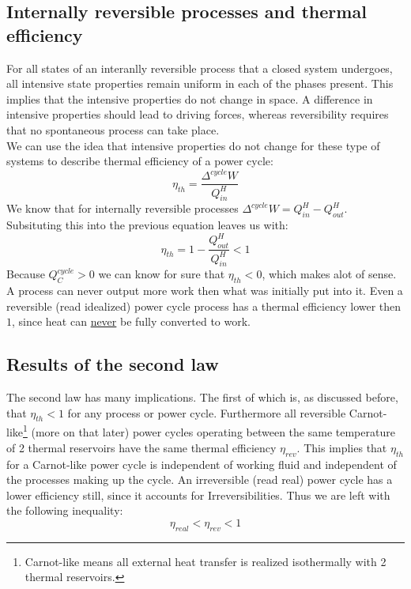 \documentclass[11pt, a4paper]{article}
\begin{document}
\subsection{Internally reversible processes and thermal efficiency}
For all states of an interanlly reversible process that a closed system undergoes, all intensive state properties remain uniform in each of the phases present. This implies that the intensive properties do not change in space. A difference in intensive properties should lead to driving forces, whereas reversibility requires that no spontaneous process can take place.\\
We can use the idea that intensive properties do not change for these type of systems to describe thermal efficiency of a power cycle:
\begin{equation}
  \eta_{th} = \frac{\Delta^{cycle}W}{Q_{in}^H}
\end{equation}
We know that for internally reversible processes $\Delta^{cycle}W = Q_{in}^H - Q_{out}^H$. Subsituting this into the previous equation leaves us with:
\begin{equation}
  \eta_{th} = 1 - \frac{Q_{out}^H}{Q_{in}^H} < 1
\end{equation}
Because $Q_C^{cycle} > 0$ we can know for sure that $\eta_{th} < 0$, which makes alot of sense. A process can never output more work then what was initially put into it. Even a reversible (read idealized) power cycle process has a thermal efficiency lower then $1$, since heat can \underline{never} be fully converted to work.


\subsection{Results of the second law}
The second law has many implications. The first of which is, as discussed before, that $\eta_{th} < 1$ for any process or power cycle. Furthermore all reversible Carnot-like\footnote{Carnot-like means all external heat transfer is realized isothermally with 2 thermal reservoirs.} (more on that later) power cycles operating between the same temperature of 2 thermal reservoirs have the same thermal efficiency $\eta_{rev}$. This implies that $\eta_{th}$ for a Carnot-like power cycle is independent of working fluid and independent of the processes making up the cycle. An irreversible (read real) power cycle has a lower efficiency still, since it accounts for Irreversibilities. Thus we are left with the following inequality:
\begin{equation}
  \eta_{real} < \eta_{rev} < 1
\end{equation}
\end{document}
